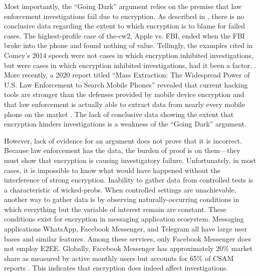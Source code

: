 Most importantly, the ``Going Dark'' argument relies on the premise that law enforcement investigations fail due to
encryption. As described in , there is no conclusive data regarding the extent to which
encryption is to blame for failed cases. The highest-profile case of \ac{the-cw2}, Apple vs. FBI, ended when the
\ac{FBI} broke into the phone and found nothing of value. Tellingly, the examples cited in Comey's 2014 speech were not
cases in which encryption inhibited investigations, but were cases in which encryption  inhibited
investigations, had it been a factor. \cite{comey_2014}. More recently, a 2020 report titled ``Mass Extraction: The
Widespread Power of U.S. Law Enforcement to Search Mobile Phones'' revealed that current hacking tools are stronger than
the defenses provided by mobile device encryption and that law enforcement is actually able to extract data from nearly
every mobile phone on the market \cite{koepke_2020}. The lack of conclusive data showing the extent that encryption
hinders investigations is a weakness of the ``Going Dark'' argument.

However, lack of evidence for an argument does not prove that it is incorrect. Because law enforcement has the data, the
burden of proof is on them---they must show that encryption is causing investigatory failure. Unfortunately, in most
cases, it is impossible to know what would have happened without the interference of strong encryption. Inability to
gather data from controlled tests is a characteristic of \acp{wicked-prob}. When controlled settings are unachievable,
another way to gather data is by observing naturally-occurring conditions in which everything but the variable of
interest remain are constant. These conditions exist for encryption in messaging application ecosystem. Messaging
applications WhatsApp, Facebook Messenger, and Telegram all have large user bases and similar features. Among these
services, only Facebook Messenger does not employ \ac{E2EE}. Globally, Facebook Messenger has approximately 20\% market
share as measured by active monthly users \cite{statista_2020} but accounts for 65\% of \ac{CSAM} reports
\cite{keller_internet_2019}. This indicates that encryption does indeed affect investigations.


